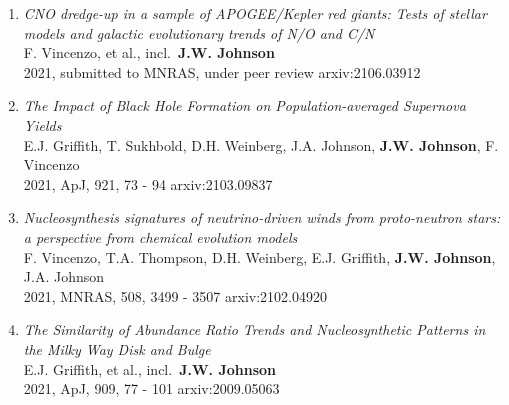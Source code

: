 \documentclass[cv.tex]{subfiles}
\begin{document}
\begin{enumerate}
	\item \textit{CNO dredge-up in a sample of APOGEE/Kepler red giants: Tests
	of stellar models and galactic evolutionary trends of N/O and C/N}
	\\
	F. Vincenzo, et al., incl.~\textbf{J.W. Johnson}
	\\
	2021, submitted to MNRAS, under peer review \hfill arxiv:2106.03912

	\item \textit{The Impact of Black Hole Formation on Population-averaged
	Supernova Yields}
	\\
	E.J. Griffith, T. Sukhbold, D.H. Weinberg, J.A. Johnson,
	\textbf{J.W. Johnson}, F. Vincenzo
	\\
	2021, ApJ, 921, 73 - 94 \hfill arxiv:2103.09837

	\item \textit{Nucleosynthesis signatures of neutrino-driven winds from
	proto-neutron stars: a perspective from chemical evolution models}
	\\
	F. Vincenzo, T.A. Thompson, D.H. Weinberg, E.J. Griffith,
	\textbf{J.W. Johnson}, J.A. Johnson
	\\
	2021, MNRAS, 508, 3499 - 3507 \hfill arxiv:2102.04920

	\item \textit{The Similarity of Abundance Ratio Trends and Nucleosynthetic
	Patterns in the Milky Way Disk and Bulge}
	\\
	E.J. Griffith, et al., incl.~\textbf{J.W. Johnson}
	\\
	2021, ApJ, 909, 77 - 101 \hfill arxiv:2009.05063

\end{enumerate}
\end{document}
